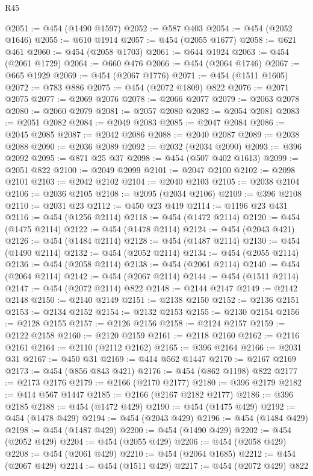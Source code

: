 \begin{lexlean}{R45}
\begin{coremodule}
@2051 := @454 (@1490 @1597)
@2052 := @587 @403
@2054 := @454 (@2052 @1646)
@2055 := @610 @1914
@2057 := @454 (@2055 @1677)
@2058 := @621 @461
@2060 := @454 (@2058 @1703)
@2061 := @644 @1924
@2063 := @454 (@2061 @1729)
@2064 := @660 @476
@2066 := @454 (@2064 @1746)
@2067 := @665 @1929
@2069 := @454 (@2067 @1776)
@2071 := @454 (@1511 @1605)
@2072 := @783 @886
@2075 := @454 (@2072 @1809) @822
@2076 := @2071 @2075
@2077 := @2069 @2076
@2078 := @2066 @2077
@2079 := @2063 @2078
@2080 := @2060 @2079
@2081 := @2057 @2080
@2082 := @2054 @2081
@2083 := @2051 @2082
@2084 := @2049 @2083
@2085 := @2047 @2084
@2086 := @2045 @2085
@2087 := @2042 @2086
@2088 := @2040 @2087
@2089 := @2038 @2088
@2090 := @2036 @2089
@2092 := @2032 (@2034 @2090)
@2093 := @396 @2092
@2095 := @871 @25 @37
@2098 := @454 (@507 @402 @1613)
@2099 := @2051 @822
@2100 := @2049 @2099
@2101 := @2047 @2100
@2102 := @2098 @2101
@2103 := @2042 @2102
@2104 := @2040 @2103
@2105 := @2038 @2104
@2106 := @2036 @2105
@2108 := @2095 (@2034 @2106)
@2109 := @396 @2108
@2110 := @2031 @23
@2112 := @450 @23 @419
@2114 := @1196 @23 @431
@2116 := @454 (@1256 @2114)
@2118 := @454 (@1472 @2114)
@2120 := @454 (@1475 @2114)
@2122 := @454 (@1478 @2114)
@2124 := @454 (@2043 @421)
@2126 := @454 (@1484 @2114)
@2128 := @454 (@1487 @2114)
@2130 := @454 (@1490 @2114)
@2132 := @454 (@2052 @2114)
@2134 := @454 (@2055 @2114)
@2136 := @454 (@2058 @2114)
@2138 := @454 (@2061 @2114)
@2140 := @454 (@2064 @2114)
@2142 := @454 (@2067 @2114)
@2144 := @454 (@1511 @2114)
@2147 := @454 (@2072 @2114) @822
@2148 := @2144 @2147
@2149 := @2142 @2148
@2150 := @2140 @2149
@2151 := @2138 @2150
@2152 := @2136 @2151
@2153 := @2134 @2152
@2154 := @2132 @2153
@2155 := @2130 @2154
@2156 := @2128 @2155
@2157 := @2126 @2156
@2158 := @2124 @2157
@2159 := @2122 @2158
@2160 := @2120 @2159
@2161 := @2118 @2160
@2162 := @2116 @2161
@2164 := @2110 (@2112 @2162)
@2165 := @396 @2164
@2166 := @2031 @31
@2167 := @450 @31
@2169 := @414 @562 @1447
@2170 := @2167 @2169
@2173 := @454 (@856 @843 @421)
@2176 := @454 (@862 @1198) @822
@2177 := @2173 @2176
@2179 := @2166 (@2170 @2177)
@2180 := @396 @2179
@2182 := @414 @567 @1447
@2185 := @2166 (@2167 @2182 @2177)
@2186 := @396 @2185
@2188 := @454 (@1472 @429)
@2190 := @454 (@1475 @429)
@2192 := @454 (@1478 @429)
@2194 := @454 (@2043 @429)
@2196 := @454 (@1484 @429)
@2198 := @454 (@1487 @429)
@2200 := @454 (@1490 @429)
@2202 := @454 (@2052 @429)
@2204 := @454 (@2055 @429)
@2206 := @454 (@2058 @429)
@2208 := @454 (@2061 @429)
@2210 := @454 (@2064 @1685)
@2212 := @454 (@2067 @429)
@2214 := @454 (@1511 @429)
@2217 := @454 (@2072 @429) @822

\end{coremodule}
\end{lexlean}
